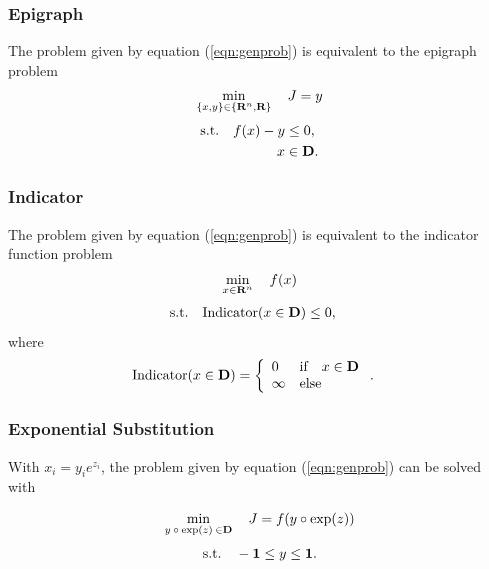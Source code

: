 \documentclass{article}
\begin{document}
\subsubsection{Epigraph}
The problem given by equation (\ref{eqn:genprob}) 
is equivalent to the epigraph problem
    \begin{align}
        \min_{\{x,y\}\in\{\textbf{R}^n,\textbf{R}\}} \quad J =y
    \end{align}
    \begin{align*}
        \text{s.t.}\quad f(x)-y&\leq0,\\
        x&\in\textbf{D}.
    \end{align*}
\subsubsection{Indicator}
The problem given by equation (\ref{eqn:genprob}) 
is equivalent to the indicator function problem
    \begin{align}
        \min_{x\in\textbf{R}^n}\quad f(x)
    \end{align}
    \begin{align*}
        \text{s.t.}\quad \text{Indicator}(x\in\textbf{D})&\leq0,
    \end{align*}    
    where
    \begin{align*}
        \text{Indicator}(x\in\textbf{D})
        &=\left\{ \begin{array}{lllllllllllllllllll}
            0 & \text{if}\quad x\in\textbf{D}\\
            \infty & \text{else}
        \end{array}\right..
    \end{align*}

\subsubsection{Exponential Substitution}


With $x_i=y_ie^{z_i}$, the problem given by equation (\ref{eqn:genprob}) can be solved with

\begin{align}
    \min_{y\:\circ\:\exp(z)\:\in\textbf{D}}\quad J = f(y\circ \exp(z))
\end{align}
\begin{align*}
    \text{s.t.}\quad -\textbf{1} \leq y \leq \textbf{1}.
\end{align*}
\end{document}
